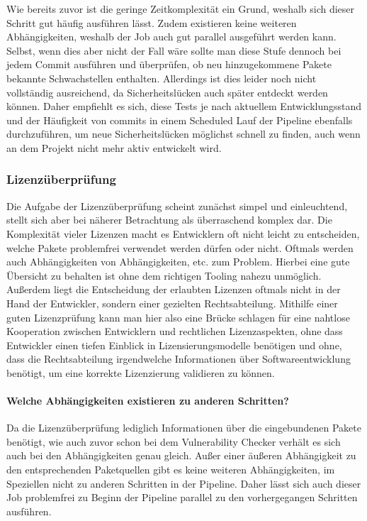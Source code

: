 Wie bereits zuvor ist die geringe Zeitkomplexität ein Grund, weshalb sich dieser Schritt gut häufig ausführen lässt.
Zudem existieren keine weiteren Abhängigkeiten, weshalb der Job auch gut parallel ausgeführt werden kann.
Selbst, wenn dies aber nicht der Fall wäre sollte man diese Stufe dennoch bei jedem Commit ausführen und überprüfen, ob neu hinzugekommene Pakete bekannte Schwachstellen enthalten.
Allerdings ist dies leider noch nicht vollständig ausreichend, da Sicherheitslücken auch später entdeckt werden können.
Daher empfiehlt es sich, diese Tests je nach aktuellem Entwicklungsstand und der Häufigkeit von commits in einem Scheduled Lauf der Pipeline ebenfalls durchzuführen, um neue Sicherheitslücken möglichst schnell zu finden, auch wenn an dem Projekt nicht mehr aktiv entwickelt wird.

\subsubsection{Lizenzüberprüfung}

Die Aufgabe der Lizenzüberprüfung scheint zunächst simpel und einleuchtend, stellt sich aber bei näherer Betrachtung als überraschend komplex dar.
Die Komplexität vieler Lizenzen macht es Entwicklern oft nicht leicht zu entscheiden, welche Pakete problemfrei verwendet werden dürfen oder nicht.
Oftmals werden auch Abhängigkeiten von Abhängigkeiten, etc. zum Problem.
Hierbei eine gute Übersicht zu behalten ist ohne dem richtigen Tooling nahezu unmöglich.
Außerdem liegt die Entscheidung der erlaubten Lizenzen oftmals nicht in der Hand der Entwickler, sondern einer gezielten Rechtsabteilung.
Mithilfe einer guten Lizenzprüfung kann man hier also eine Brücke schlagen für eine nahtlose Kooperation zwischen Entwicklern und rechtlichen Lizenzaspekten, ohne dass Entwickler einen tiefen Einblick in Lizensierungsmodelle benötigen und ohne, dass die Rechtsabteilung irgendwelche Informationen über Softwareentwicklung benötigt, um eine korrekte Lizenzierung validieren zu können.

\paragraph{Welche Abhängigkeiten existieren zu anderen Schritten?}

Da die Lizenzüberprüfung lediglich Informationen über die eingebundenen Pakete benötigt, wie auch zuvor schon bei dem Vulnerability Checker verhält es sich auch bei den Abhängigkeiten genau gleich.
Außer einer äußeren Abhängigkeit zu den entsprechenden Paketquellen gibt es keine weiteren Abhängigkeiten, im Speziellen nicht zu anderen Schritten in der Pipeline.
Daher lässt sich auch dieser Job problemfrei zu Beginn der Pipeline parallel zu den vorhergegangen Schritten ausführen.


